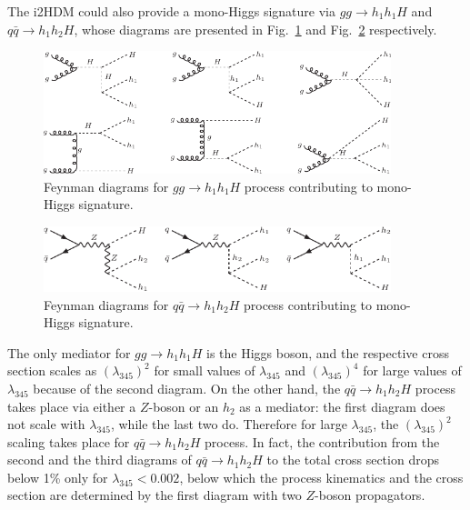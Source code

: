 \documentclass[12pt,a4paper]{article}
\begin{document}
The i2HDM could also provide a mono-Higgs signature
via $gg\to  h_1 h_1 H$ and $q\bar{q} \to  h_1 h_2H$,
whose diagrams are presented in Fig.~\ref{fig:fd-mono-H1}
and Fig.~\ref{fig:fd-mono-H2} respectively.
%
\begin{figure}[h!]
\begin{center}
\includegraphics[width=0.9\textwidth]{fd-mono-h1.pdf} 
\caption{Feynman diagrams for $gg\to h_1 h_1H$  process 
contributing to mono-Higgs signature.}
\label{fig:fd-mono-H1}
\end{center}
\end{figure}
\begin{figure}[h!]
\begin{center}
\includegraphics[width=0.9\textwidth]{fd-mono-h2.pdf} 
\caption{Feynman diagrams for $q\bar{q}\to h_1 h_2H$  process 
  contributing to mono-Higgs signature.}
\label{fig:fd-mono-H2}
\end{center}
\end{figure}
The only mediator for $gg\to  h_1 h_1 H$ is the Higgs boson,
and the respective cross section scales as $(\lambda_{345})^2$
for small values of $\lambda_{345}$ 
and $(\lambda_{345})^4$ for large values of $\lambda_{345}$
because of the second diagram.
On the other hand, the $q\bar{q}\to h_1 h_2H$  process 
takes place via either a $Z$-boson or an $h_2$ as a mediator:
the first diagram does not scale with $\lambda_{345}$,
while the last two do. Therefore for large $\lambda_{345}$,
the $(\lambda_{345})^2$  scaling takes place for $q\bar{q}\to h_1 h_2H$ process.
In fact,  the contribution from the second and 
the third  diagrams of  $q\bar{q}\to h_1 h_2H$
to the total cross section
drops below 1\% only for $\lambda_{345}<0.002$,
below which the process kinematics and the cross section 
are determined by the first diagram with two $Z$-boson propagators.
\end{document}
